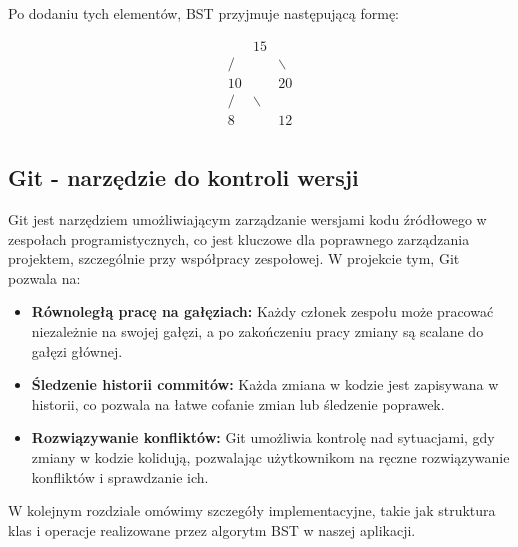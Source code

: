 Po dodaniu tych elementów, BST przyjmuje następującą formę:

\[
  \begin{array}{ccc}
       & 15         &            \\
    /  &            & \backslash \\
    10 &            & 20         \\
    /  & \backslash &            \\
    8  &            & 12         \\
  \end{array}
\]

\subsection{Git - narzędzie do kontroli wersji}

Git jest narzędziem umożliwiającym zarządzanie wersjami kodu źródłowego w zespołach programistycznych, co jest kluczowe dla poprawnego zarządzania projektem, szczególnie przy współpracy zespołowej. W projekcie tym, Git pozwala na:
\begin{itemize}
  \item \textbf{Równoległą pracę na gałęziach:} Każdy członek zespołu może pracować niezależnie na swojej gałęzi, a po zakończeniu pracy zmiany są scalane do gałęzi głównej.
  \item \textbf{Śledzenie historii commitów:} Każda zmiana w kodzie jest zapisywana w historii, co pozwala na łatwe cofanie zmian lub śledzenie poprawek.
  \item \textbf{Rozwiązywanie konfliktów:} Git umożliwia kontrolę nad sytuacjami, gdy zmiany w kodzie kolidują, pozwalając użytkownikom na ręczne rozwiązywanie konfliktów i sprawdzanie ich.
\end{itemize}

W kolejnym rozdziale omówimy szczegóły implementacyjne, takie jak struktura klas i operacje realizowane przez algorytm BST w naszej aplikacji.

